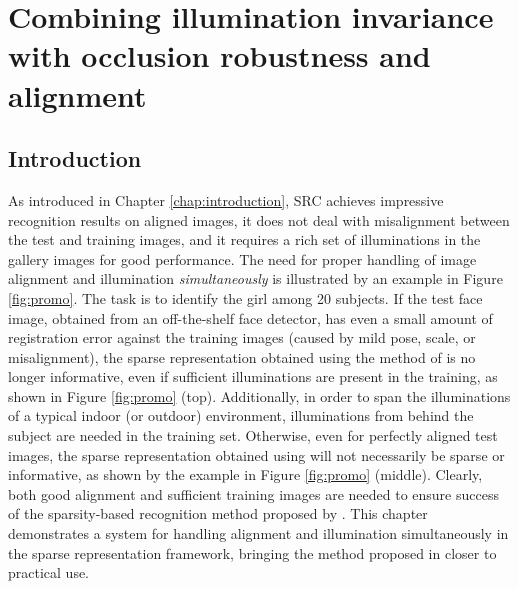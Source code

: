 \chapter{Combining illumination invariance with occlusion robustness and alignment}
\label{chap:pipeline}

\section{Introduction}
%

As introduced in Chapter \ref{chap:introduction}, SRC \cite{Wright2009-PAMI} 
achieves impressive recognition results on aligned images,
it does not deal with misalignment between the test and training
images, and it requires a rich set of illuminations in the gallery images for
good performance.  The need for proper handling of image alignment and
illumination {\em simultaneously} is illustrated by an example in Figure \ref{fig:promo}.  
The task is to
identify the girl among 20 subjects. If the test face image, obtained from
an off-the-shelf face detector, has even a small amount of registration error
against the training images (caused by mild pose, scale, or misalignment), the
sparse representation obtained using the method of \cite{Wright2009-PAMI} is no
longer informative, even if sufficient illuminations are present in the
training, as shown in Figure \ref{fig:promo} (top). Additionally, in order to
span the illuminations of a typical indoor (or outdoor) environment,
illuminations from behind the subject are needed in the training set.
Otherwise, even for perfectly aligned test images, the sparse representation
obtained using \cite{Wright2009-PAMI} will not necessarily be sparse or
informative, as shown by the example in Figure \ref{fig:promo} (middle).
Clearly, both good alignment and sufficient training images are needed
to ensure success of the sparsity-based recognition method proposed by
\cite{Wright2009-PAMI}.  This chapter demonstrates a system for handling alignment
and illumination simultaneously in the sparse representation framework,
bringing the method proposed in \cite{Wright2009-PAMI} closer to practical use.

